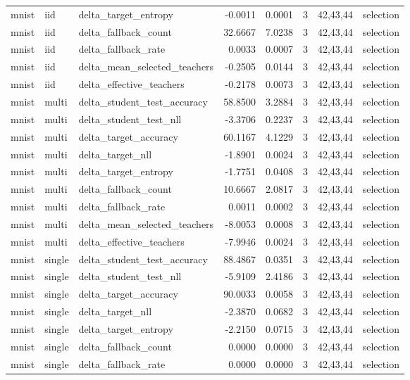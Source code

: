 \begin{tabular}{lllrrrll}
mnist & iid & delta\_target\_entropy & -0.0011 & 0.0001 & 3 & 42,43,44 & selection \\
mnist & iid & delta\_fallback\_count & 32.6667 & 7.0238 & 3 & 42,43,44 & selection \\
mnist & iid & delta\_fallback\_rate & 0.0033 & 0.0007 & 3 & 42,43,44 & selection \\
mnist & iid & delta\_mean\_selected\_teachers & -0.2505 & 0.0144 & 3 & 42,43,44 & selection \\
mnist & iid & delta\_effective\_teachers & -0.2178 & 0.0073 & 3 & 42,43,44 & selection \\
mnist & multi & delta\_student\_test\_accuracy & 58.8500 & 3.2884 & 3 & 42,43,44 & selection \\
mnist & multi & delta\_student\_test\_nll & -3.3706 & 0.2237 & 3 & 42,43,44 & selection \\
mnist & multi & delta\_target\_accuracy & 60.1167 & 4.1229 & 3 & 42,43,44 & selection \\
mnist & multi & delta\_target\_nll & -1.8901 & 0.0024 & 3 & 42,43,44 & selection \\
mnist & multi & delta\_target\_entropy & -1.7751 & 0.0408 & 3 & 42,43,44 & selection \\
mnist & multi & delta\_fallback\_count & 10.6667 & 2.0817 & 3 & 42,43,44 & selection \\
mnist & multi & delta\_fallback\_rate & 0.0011 & 0.0002 & 3 & 42,43,44 & selection \\
mnist & multi & delta\_mean\_selected\_teachers & -8.0053 & 0.0008 & 3 & 42,43,44 & selection \\
mnist & multi & delta\_effective\_teachers & -7.9946 & 0.0024 & 3 & 42,43,44 & selection \\
mnist & single & delta\_student\_test\_accuracy & 88.4867 & 0.0351 & 3 & 42,43,44 & selection \\
mnist & single & delta\_student\_test\_nll & -5.9109 & 2.4186 & 3 & 42,43,44 & selection \\
mnist & single & delta\_target\_accuracy & 90.0033 & 0.0058 & 3 & 42,43,44 & selection \\
mnist & single & delta\_target\_nll & -2.3870 & 0.0682 & 3 & 42,43,44 & selection \\
mnist & single & delta\_target\_entropy & -2.2150 & 0.0715 & 3 & 42,43,44 & selection \\
mnist & single & delta\_fallback\_count & 0.0000 & 0.0000 & 3 & 42,43,44 & selection \\
mnist & single & delta\_fallback\_rate & 0.0000 & 0.0000 & 3 & 42,43,44 & selection \\

\end{tabular}
